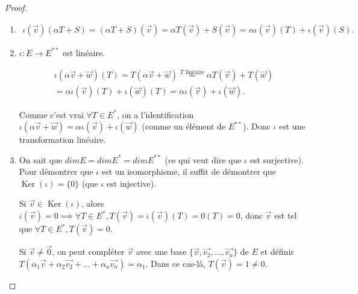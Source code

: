 \documentclass[french]{article}
\theoremstyle{definition}
\theoremstyle{remark}
\begin{document}
\begin{proof}

  \

  \begin{enumerate}
    \item \begin{gather*}
      \iota(\overrightarrow{ v } ) (\alpha T+ S) = (\alpha T+S)(\overrightarrow{ v } ) = \alpha T(\overrightarrow{ v } )+ S(\overrightarrow{ v } ) = \alpha \iota(\overrightarrow{ v } )(T)+ \iota(\overrightarrow{ v } )(S).
  \end{gather*}
    \item $\iota : E \to E ^{**}$ est linéaire.

    \begin{gather*}
      \iota(\alpha \overrightarrow{ v } + \overrightarrow{ w }  )(T) = T(\alpha \overrightarrow{ v } + \overrightarrow{ w } ) \stackrel{T \text{ linéaire} }{=} \alpha T(\overrightarrow{ v } )+ T(\overrightarrow{ w } ) \\
      = \alpha \iota(\overrightarrow{ v } )(T)+ \iota(\overrightarrow{ w } ) (T) = \alpha \iota (\overrightarrow{ v } )+ \iota(\overrightarrow{ w }).
    \end{gather*}

    Comme c'est vrai $\forall T \in E ^{*}$, on a l'identification $\iota(\alpha \overrightarrow{ v }+ \overrightarrow{ w }  ) = \alpha \iota(\overrightarrow{ v } )+ \iota(\overrightarrow{ w } )$ (comme un élément de $E ^{**}$). Donc $\iota$ est une transformation linéaire.

    \item On sait que $dim E = dim E ^{*} = dim E ^{**}$ (ce qui veut dire que $\iota$ est surjective). Pour démontrer que $\iota$ est un isomorphisme, il suffit de démontrer que $\operatorname{Ker}(\iota) = \{ 0 \} $ (que $\iota$ est injective).

    Si $\overrightarrow{ v }  \in \operatorname{Ker}(\iota)$, alors $\iota(\overrightarrow{ v } ) = 0 \implies \forall T \in E ^{*}, T(\overrightarrow{ v } ) = \iota(\overrightarrow{ v })(T) = 0(T) =0$, donc $\overrightarrow{ v } $ est tel que $\forall T \in E ^{*}, T(\overrightarrow{ v } ) =0$.

    Si $\overrightarrow{ v } \neq \overrightarrow{ 0 }  $, on peut compléter $\overrightarrow{ v } $ avec une base $\{ \overrightarrow{ v }, \overrightarrow{ v_2 },\dots, \overrightarrow{ v_n } \} $ de $E$ et définir $T(\alpha_1 \overrightarrow{ v } + \alpha_2 \overrightarrow{ v_2 } + \dots + \alpha_n \overrightarrow{ v_n }  ) = \alpha_1$. Dans ce cas-là, $T(\overrightarrow{ v } ) = 1 \neq 0$.


\end{enumerate}
\end{proof}
\end{document}

